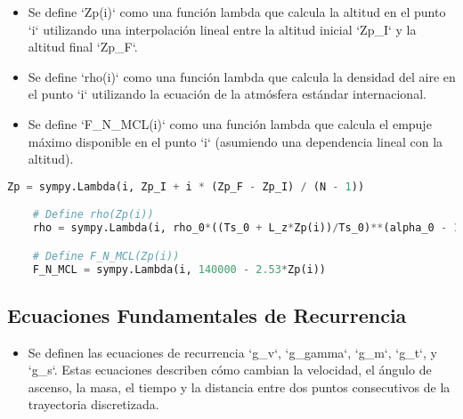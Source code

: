 \documentclass[fleqn]{article}
\begin{document}
\begin{itemize}
    \item Se define `Zp(i)` como una función lambda que calcula la altitud en el punto `i` utilizando una interpolación lineal entre la altitud inicial `Zp\_I` y la altitud final `Zp\_F`.
    \item Se define `rho(i)` como una función lambda que calcula la densidad del aire en el punto `i` utilizando la ecuación de la atmósfera estándar internacional.
    \item Se define `F\_N\_MCL(i)` como una función lambda que calcula el empuje máximo disponible en el punto `i` (asumiendo una dependencia lineal con la altitud).
\end{itemize}

\begin{lstlisting}[language=Python, firstnumber=last, style = mystyle, mathescape=true]
    Zp = sympy.Lambda(i, Zp_I + i * (Zp_F - Zp_I) / (N - 1))

    # Define rho(Zp(i))
    rho = sympy.Lambda(i, rho_0*((Ts_0 + L_z*Zp(i))/Ts_0)**(alpha_0 - 1))

    # Define F_N_MCL(Zp(i))
    F_N_MCL = sympy.Lambda(i, 140000 - 2.53*Zp(i))
\end{lstlisting}

\subsection{Ecuaciones Fundamentales de Recurrencia}



\begin{itemize}
    \item Se definen las ecuaciones de recurrencia `g\_v`, `g\_gamma`, `g\_m`, `g\_t`, y `g\_s`. Estas ecuaciones describen cómo cambian la velocidad, el ángulo de ascenso, la masa, el tiempo y la distancia entre dos puntos consecutivos de la trayectoria discretizada. 
\end{itemize}
\end{document}
